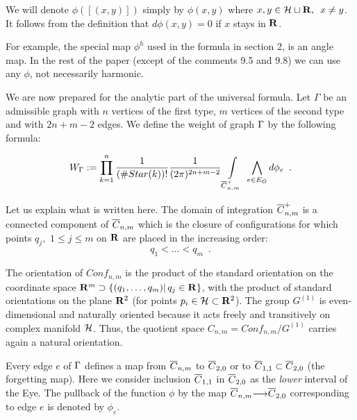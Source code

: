      We will denote $\phi([(x,y)])$ simply by $\phi(x,y)$ where
      $x,y\in {\cal H}\sqcup {\bf R},\,\,\,x\ne y$.
   It follows from the definition that $d\phi(x,y)
   =0$ if $x$ stays in ${\bf R}$.
       
      For example,
      the special map $\phi^{h}$ used in the formula in section 2,
       is an angle map. In the rest of the paper
  (except of the comments 9.5 and 9.8) we can use any $\phi$, not necessarily
   harmonic. 
     
    
    
       We are now prepared for the analytic part of the universal formula.
        Let  $\Gamma$ be an admissible graph
        with $n$ vertices of the first type, $m$ vertices
         of the second type and with $2n+m-2$ edges.
           We define the weight of graph ${\Gamma}$ by the following formula:
        
        $$W_{\Gamma}:=
       \prod_{k=1}^n {1\over
(\# Star (k))!} {1\over (2\pi)^{2n+m-2}}
        \int\limits_{{\overline C}_{n,m}^+}\,\,\bigwedge _{e\in E_G} 
        d\phi_e\,\,\,.$$
        
        Let us explain what is written here. The domain of integration
         ${\overline C}_{n,m}^+$ is a connected component of ${\overline C}_{n,m}$
          which is the closure of configurations for which
           points $q_j,\,\,1\le j\le m$ on ${\bf R}$ are
            placed in the increasing order:
            $$q_1<\dots<q_m\,\,\,.$$
            
           The orientation of $Conf_{n,m}$ is the product of the
            standard orientation on the coordinate space ${\bf R}^m\supset
            \{(q_1,\dots,q_m)|\,q_j\in {\bf R}\}$, with the product
             of standard orientations on the plane ${\bf R}^2$ (for points
              $p_i\in{\cal H}
             \subset {\bf R}^2$). The group $G^{(1)}$ 
               is even-dimensional and naturally oriented
                because it acts freely and transitively
                 on complex manifold ${\cal H}$. Thus, the
              quotient space $C_{n,m}=Conf_{n,m}/G^{(1)}$
              carries again a natural orientation. 
                 
              
                
                Every edge $e$ of ${\Gamma}$ defines a map from ${\overline C}_{n,m}$
                 to ${\overline C}_{2,0}$ or to ${\overline C}_{1,1}\subset {\overline C}_{2,0}$
                  (the forgetting map). Here we consider inclusion
                  ${\overline C}_{1,1}$ in ${\overline C}_{2,0}$ as the {\it lower}
                   interval of the Eye. 
                 The pullback of the function $\phi$ 
                  by the  map ${\overline C}_{n,m}{\longrightarrow} {\overline C}_{2,0}$ corresponding to 
                  edge $e$
              is denoted by $\phi_e$.
                  
